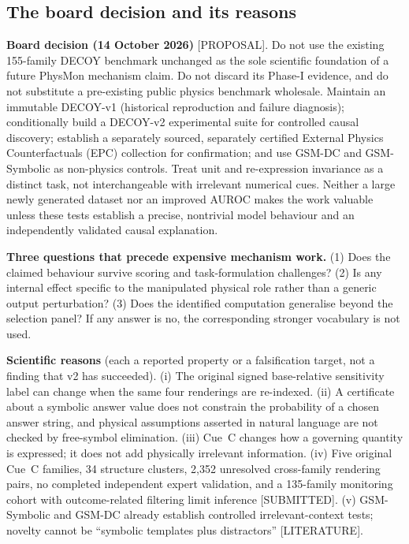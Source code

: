 \documentclass[10pt,a4paper]{article}
\newcommand{\tg}[1]{\textsc{[#1]}}
\begin{document}
\subsection{The board decision and its reasons}\label{sec:phaseB-decision}

\textbf{Board decision (14 October 2026)} \tg{PROPOSAL}. Do not use the existing 155-family DECOY benchmark
unchanged as the sole scientific foundation of a future PhysMon mechanism claim. Do not discard its Phase-I
evidence, and do not substitute a pre-existing public physics benchmark wholesale. Maintain an immutable
DECOY-v1 (historical reproduction and failure diagnosis); conditionally build a DECOY-v2 experimental suite for
controlled causal discovery; establish a separately sourced, separately certified External Physics
Counterfactuals (EPC) collection for confirmation; and use GSM-DC and GSM-Symbolic as non-physics controls.
Treat unit and re-expression invariance as a distinct task, not interchangeable with irrelevant numerical cues.
Neither a large newly generated dataset nor an improved AUROC makes the work valuable unless these tests
establish a precise, nontrivial model behaviour and an independently validated causal explanation.

\textbf{Three questions that precede expensive mechanism work.} (1) Does the claimed behaviour survive scoring
and task-formulation challenges? (2) Is any internal effect specific to the manipulated physical role rather
than a generic output perturbation? (3) Does the identified computation generalise beyond the selection panel?
If any answer is no, the corresponding stronger vocabulary is not used.

\textbf{Scientific reasons} (each a reported property or a falsification target, not a finding that v2 has
succeeded). (i) The original signed base-relative sensitivity label can change when the same four renderings are
re-indexed. (ii) A certificate about a symbolic answer value does not constrain the probability of a chosen answer
string, and physical assumptions asserted in natural language are not checked by free-symbol elimination.
(iii) Cue~C changes how a governing quantity is expressed; it does not add physically irrelevant information.
(iv) Five original Cue~C families, 34 structure clusters, 2,352 unresolved cross-family rendering pairs, no
completed independent expert validation, and a 135-family monitoring cohort with outcome-related filtering
limit inference \tg{SUBMITTED}. (v) GSM-Symbolic and GSM-DC already establish controlled irrelevant-context
tests; novelty cannot be ``symbolic templates plus distractors'' \tg{LITERATURE}.
\end{document}
